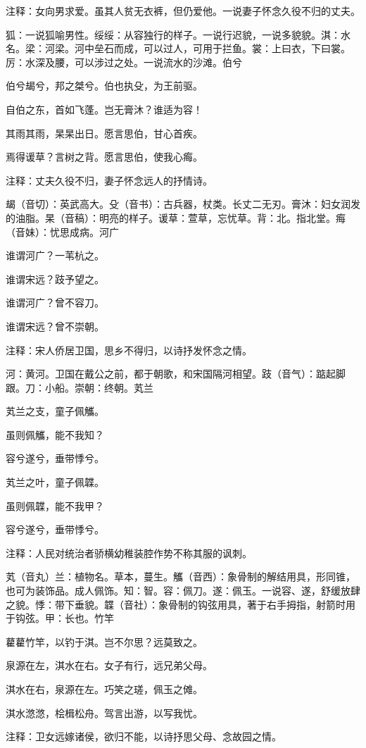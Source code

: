 \documentclass[12pt,UTF8]{ctexbook}
\begin{document}
注释：女向男求爱。虽其人贫无衣裤，但仍爱他。一说妻子怀念久役不归的丈夫。

狐：一说狐喻男性。绥绥：从容独行的样子。一说行迟貌，一说多貌貌。淇：水名。梁：河梁。河中垒石而成，可以过人，可用于拦鱼。裳：上曰衣，下曰裳。厉：水深及腰，可以涉过之处。一说流水的沙滩。伯兮

伯兮朅兮，邦之桀兮。伯也执殳，为王前驱。

自伯之东，首如飞蓬。岂无膏沐？谁适为容！

其雨其雨，杲杲出日。愿言思伯，甘心首疾。

焉得谖草？言树之背。愿言思伯，使我心痗。

注释：丈夫久役不归，妻子怀念远人的抒情诗。

朅（音切）：英武高大。殳（音书）：古兵器，杖类。长丈二无刃。膏沐：妇女润发的油脂。杲（音稿）：明亮的样子。谖草：萱草，忘忧草。背：北。指北堂。痗（音妹）：忧思成病。河广

谁谓河广？一苇杭之。

谁谓宋远？跂予望之。

谁谓河广？曾不容刀。

谁谓宋远？曾不崇朝。

注释：宋人侨居卫国，思乡不得归，以诗抒发怀念之情。

河：黄河。卫国在戴公之前，都于朝歌，和宋国隔河相望。跂（音气）：踮起脚跟。刀：小船。崇朝：终朝。芄兰

芄兰之支，童子佩觿。

虽则佩觿，能不我知？

容兮遂兮，垂带悸兮。

芄兰之叶，童子佩韘。

虽则佩韘，能不我甲？

容兮遂兮，垂带悸兮。

注释：人民对统治者骄横幼稚装腔作势不称其服的讽刺。

芄（音丸）兰：植物名。草本，蔓生。觿（音西）：象骨制的解结用具，形同锥，也可为装饰品。成人佩饰。知：智。容：佩刀。遂：佩玉。一说容、遂，舒缓放肆之貌。悸：带下垂貌。韘（音社）：象骨制的钩弦用具，著于右手拇指，射箭时用于钩弦。甲：长也。竹竿

藋藋竹竿，以钓于淇。岂不尔思？远莫致之。

泉源在左，淇水在右。女子有行，远兄弟父母。

淇水在右，泉源在左。巧笑之瑳，佩玉之傩。

淇水滺滺，桧楫松舟。驾言出游，以写我忧。

注释：卫女远嫁诸侯，欲归不能，以诗抒思父母、念故园之情。
\end{document}
